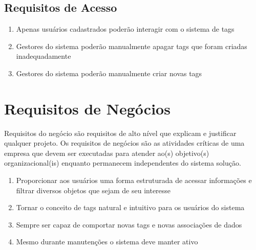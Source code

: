         \subsection{Requisitos de Acesso}
            \begin{enumerate}
                \item Apenas usuários cadastrados poderão interagir com o sistema de tags
                \item Gestores do sistema poderão manualmente apagar tags que foram criadas inadequadamente
                \item Gestores do sistema poderão manualmente criar novas tags
            \end{enumerate}

     \section{Requisitos de Negócios}
         Requisitos do negócio são requisitos de alto nível que explicam e justificar qualquer projeto. Os requisitos de negócios são as atividades críticas de uma empresa que devem ser executadas para atender ao(s) objetivo(s) organizacional(is) enquanto permanecem independentes do sistema solução.

        \begin{enumerate}
            \item Proporcionar aos usuários uma forma estruturada de acessar informações e filtrar diversos objetos que sejam de seu interesse
            \item Tornar o conceito de tags natural e intuitivo para os usuários do sistema
            \item Sempre ser capaz de comportar novas tags e novas associações de dados 
            \item Mesmo durante manutenções o sistema deve manter ativo
        \end{enumerate}





